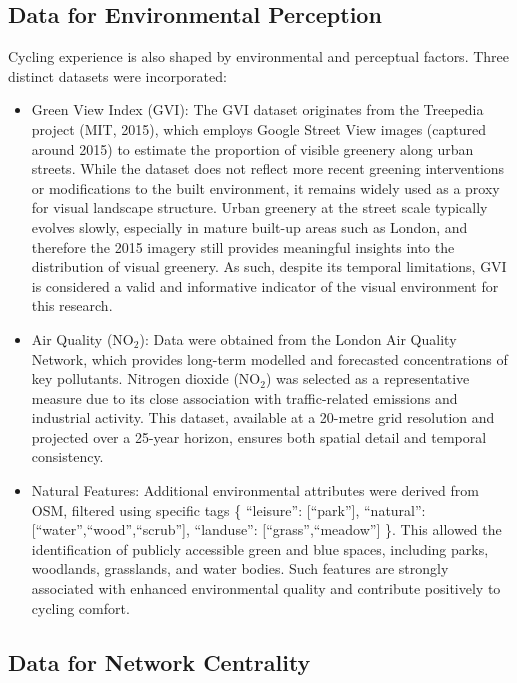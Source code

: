 \documentclass[
  12pt,
  oneside]{book}
\begin{document}
\subsection{Data for Environmental Perception}\label{data-for-environmental-perception}

Cycling experience is also shaped by environmental and perceptual factors. Three distinct datasets were incorporated:

\begin{itemize}
\item
  Green View Index (GVI): The GVI dataset originates from the Treepedia project (MIT, 2015), which employs Google Street View images (captured around 2015) to estimate the proportion of visible greenery along urban streets. While the dataset does not reflect more recent greening interventions or modifications to the built environment, it remains widely used as a proxy for visual landscape structure. Urban greenery at the street scale typically evolves slowly, especially in mature built-up areas such as London, and therefore the 2015 imagery still provides meaningful insights into the distribution of visual greenery. As such, despite its temporal limitations, GVI is considered a valid and informative indicator of the visual environment for this research.
\item
  Air Quality (NO\(_2\)): Data were obtained from the London Air Quality Network, which provides long-term modelled and forecasted concentrations of key pollutants. Nitrogen dioxide (NO\(_2\)) was selected as a representative measure due to its close association with traffic-related emissions and industrial activity. This dataset, available at a 20-metre grid resolution and projected over a 25-year horizon, ensures both spatial detail and temporal consistency.
\item
  Natural Features: Additional environmental attributes were derived from OSM, filtered using specific tags \{ ``leisure'': {[}``park''{]}, ``natural'': {[}``water'',``wood'',``scrub''{]}, ``landuse'': {[}``grass'',``meadow''{]} \}. This allowed the identification of publicly accessible green and blue spaces, including parks, woodlands, grasslands, and water bodies. Such features are strongly associated with enhanced environmental quality and contribute positively to cycling comfort.
\end{itemize}

\subsection{Data for Network Centrality}\label{data-for-network-centrality}
\end{document}
